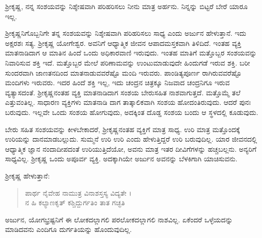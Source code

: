 {\small ಶ್ರೀಕೃಷ್ಣ, ನನ್ನ ಸಂಶಯವನ್ನು ನಿಶ್ಶೇಷವಾಗಿ ಪರಿಹರಿಸಲು ನೀನು ಮಾತ್ರ ಅರ್ಹನು. ನಿನ್ನನ್ನು ಬಿಟ್ಟರೆ ಬೇರೆ ಯಾರೂ ಇಲ್ಲ.}

ಶ್ರೀಕೃಷ್ಣನಿಗೊಬ್ಬನಿಗೇ ತನ್ನ ಸಂಶಯವನ್ನು ನಿಶ್ಶೇಷವಾಗಿ ಪರಿಹರಿಸಲು ಸಾಧ್ಯ ಎಂದು ಅರ್ಜುನ ಹೇಳುತ್ತಾನೆ. ಇದು ಅಕ್ಷರಶಃ ಸತ್ಯ. ಶ್ರೀಕೃಷ್ಣ ಯೋಗೇಶ್ವರ. ಅವನಿಗೆ ಆಧ್ಯಾತ್ಮಿಕ ಜೀವನ ಆಪಾದಮಸ್ತಕವಾಗಿ ತಿಳಿದಿದೆ. ಇಂತಹ ವ್ಯಕ್ತಿ ಮಾತನಾಡಿದಾಗ ಆ ಮಾತಿನ ಹಿಂದೆ ಒಂದು ಅಧಿಕಾರವಾಣಿ ಇರುವುದು. ಇಂತಹ ಮಾತಿಗೆ ಮತ್ತೊಬ್ಬರ ಸಂಶಯವನ್ನು ನಿವಾರಿಸುವ ಶಕ್ತಿ ಇದೆ. ಮತ್ತೊಬ್ಬರ ಮೇಲೆ ಪರಿಣಾಮವನ್ನು ಉಂಟುಮಾಡುವುದೇ ಹಿಂದುಗಡೆ ಇರುವ ಶಕ್ತಿ. ಬರೀ ಸುಂದರವಾಗಿ ಜಾಣತನದಿಂದ ಮಾತನಾಡುವವರೆಷ್ಟೊ ಮಂದಿ ಇರುವರು. ಪಾಂಡಿತ್ಯಪೂರ್ಣ ರಾಗಿರುವವರೆಷ್ಟೊ ಮಂದಿಗಳು ಇರುವರು. ಇದರ ಹಿಂದೆ ಶಕ್ತಿ ಇಲ್ಲ, ಇದು ಚಂದ್ರನ ಚಿತ್ರಕ್ಕೂ ನಿಜವಾದ ಚಂದ್ರನಿಗೂ ಇರುವ ವ್ಯತ್ಯಾಸದಂತೆ. ಶ್ರೀಕೃಷ್ಣನಂತಹ ವ್ಯಕ್ತಿ ಮಾತನಾಡಿದಾಗ ಸಂಶಯ ಬೇರುಸಹಿತ ನಾಶವಾಗುತ್ತದೆ. ಮತ್ತೊಮ್ಮೆ ತಲೆ ಎತ್ತುವಂತಿಲ್ಲ. ಸಾಧಾರಣ ವ್ಯಕ್ತಿಗಳು ಮಾತನಾಡಿ ದಾಗ ತಾತ್ಕಾಲಿಕವಾಗಿ ಸಂಶಯ ಹೋದಂತಿರುವುದು. ಆದರೆ ಪುನಃ ಬರುವುದು. ಇಲ್ಲವೇ ಒಂದು ಸಂಶಯ ಹೋಗುವುದು, ಅದಕ್ಕಿಂತ ದೊಡ್ಡ ಸಂಶಯ ಬಂದು ಆ ಸ್ಥಳದಲ್ಲಿ ಕೂಡುವುದು.

ಬೇರು ಸಹಿತ ಸಂಶಯವನ್ನು ಕೀಳಬೇಕಾದರೆ, ಶ್ರೀಕೃಷ್ಣನಂತಹ ವ್ಯಕ್ತಿಗೆ ಮಾತ್ರ ಸಾಧ್ಯ. ಉರಿ ಮಾತ್ರ ಮತ್ತೊಂದಕ್ಕೆ ಉರಿಯನ್ನು ದಾನಮಾಡಬಲ್ಲುದು. ಸುಮ್ಮನೆ ಉರಿ ಉರಿ ಎಂದು ಹೇಳುತ್ತಿದ್ದರೆ ಉರಿ ಬರುವುದಿಲ್ಲ. ಯಾರ ಜೀವನದಲ್ಲಿ ಆಧ್ಯಾತ್ಮಿಕ ಜ್ಞಾನ ನಂದಾದೀಪದಂತೆ ಉರಿಯುತ್ತಿದೆಯೋ, ಅವನು ಮಾತ್ರ ಇತರ ದೀವಿಗೆಗಳನ್ನು ಹಚ್ಚಬಲ್ಲನು. ಅನ್ಯರಿಗೆ ಸಾಧ್ಯವಿಲ್ಲ. ಶ್ರೀಕೃಷ್ಣ ಒಂದು ಅಪೂರ್ವ ವ್ಯಕ್ತಿ. ಅದಕ್ಕಾಗಿಯೇ ಅರ್ಜುನ ಅವನನ್ನು ಬೆಳಕಿಗಾಗಿ ಯಾಚಿಸುವನು.

ಶ್ರೀಕೃಷ್ಣ ಹೇಳುತ್ತಾನೆ:

\begin{verse}
ಪಾರ್ಥ ನೈವೇಹ ನಾಮುತ್ರ ವಿನಾಶಸ್ತಸ್ಯ ವಿದ್ಯತೇ ।\\ನ ಹಿ ಕಲ್ಯಾಣಕೃತ್ ಕಶ್ಚಿದ್ದುರ್ಗತಿಂ ತಾತ ಗಚ್ಛತಿ 
\end{verse}

{\small ಅರ್ಜುನ, ಯೋಗಭ್ರಷ್ಟನಿಗೆ ಈ ಲೋಕದಲ್ಲಾಗಲಿ ಪರಲೋಕದಲ್ಲಾಗಲಿ ನಾಶವಿಲ್ಲ. ಏಕೆಂದರೆ ಒಳ್ಳೆಯದನ್ನು ಮಾಡಿದವನು ಎಂದಿಗೂ ದುರ್ಗತಿಯನ್ನು ಹೊಂದುವುದಿಲ್ಲ.}

